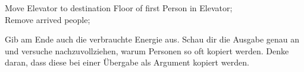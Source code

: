 \documentclass[
  accentcolor=tud1c,	%
  colorbacktitle,		%
  inverttitle,			%
  german,				%
  twoside
]{tudexercise}
\begin{document}
\begin{enumerate}
\begin{algorithm}[H]
{   {
    Move Elevator to destination Floor of first Person in Elevator; \\
    Remove arrived people; \\
  }
 }
\end{algorithm}

Gib am Ende auch die verbrauchte Energie aus.
Schau dir die Ausgabe genau an und versuche nachzuvollziehen, warum Personen so oft kopiert werden.
Denke daran, dass diese bei einer Übergabe als Argument kopiert werden.
\end{enumerate}
\end{document}
